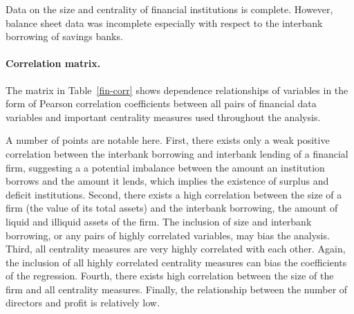 \documentclass[11pt,fleqn]{article}
\begin{document}
Data on the size and centrality of financial institutions is complete. However, balance sheet data was incomplete especially with respect to the interbank borrowing of savings banks.

\paragraph{Correlation matrix.}

The matrix in Table~\ref{fin-corr} shows dependence relationships of variables in the form of Pearson correlation coefficients between all pairs of financial data variables and important centrality measures used throughout the analysis.

A number of points are notable here. First, there exists only a weak positive correlation between the interbank borrowing and interbank lending of a financial firm, suggesting a a potential imbalance between the amount an institution borrows and the amount it lends, which implies the existence of surplus and deficit institutions. Second, there exists a high correlation between the size of a firm (the value of its total assets) and the interbank borrowing, the amount of liquid and illiquid assets of the firm. The inclusion of size and interbank borrowing, or any pairs of highly correlated variables, may bias the analysis. Third, all centrality measures are very highly correlated with each other. Again, the inclusion of all highly correlated centrality measures can bias the coefficients of the regression. Fourth, there exists high correlation between the size of the firm and all centrality measures. Finally, the relationship between the number of directors and profit is relatively low.
\end{document}
